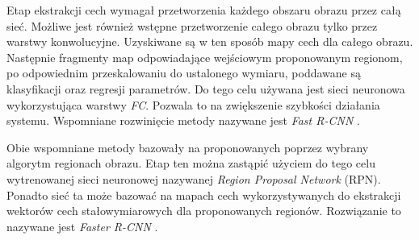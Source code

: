 Etap ekstrakcji cech wymagał przetworzenia każdego obszaru obrazu przez całą sieć.
Możliwe jest również wstępne przetworzenie całego obrazu tylko przez warstwy konwolucyjne.
Uzyskiwane są w ten sposób mapy cech dla całego obrazu.
Następnie fragmenty map odpowiadające wejściowym proponowanym regionom, po odpowiednim przeskalowaniu do ustalonego wymiaru, poddawane są klasyfikacji oraz regresji parametrów.
Do tego celu używana jest sieci neuronowa wykorzystująca warstwy \emph{FC}.
Pozwala to na zwiększenie szybkości działania systemu.
Wspomniane rozwinięcie metody nazywane jest \emph{Fast R-CNN} \cite{fast_rcnn}.

Obie wspomniane metody bazowały na proponowanych poprzez wybrany algorytm regionach obrazu.
Etap ten można zastąpić użyciem do tego celu wytrenowanej sieci neuronowej nazywanej \emph{Region Proposal Network} (RPN).
Ponadto sieć ta może bazować na mapach cech wykorzystywanych do ekstrakcji wektorów cech stałowymiarowych  dla proponowanych regionów. 
Rozwiązanie to nazywane jest \emph{Faster R-CNN} \cite{faster_rcnn}.

